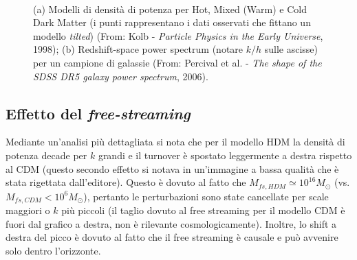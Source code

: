 \begin{figure}[H]
    $\;\;$
    \caption{(a) Modelli di densità di potenza per Hot, Mixed (Warm) e Cold Dark Matter (i punti rappresentano i dati osservati che fittano un modello \textit{tilted}) (From: Kolb - \textit{Particle Physics in the Early Universe}, 1998); (b) Redshift-space power spectrum (notare $k/h$ sulle ascisse) per un campione di galassie (From: Percival et al. - \textit{The shape of the SDSS DR5 galaxy power spectrum}, 2006).} \label{fig8:bella3} 
\end{figure}


\subsection{Effetto del \textit{free-streaming}}
Mediante un'analisi più dettagliata si nota che per il modello HDM la densità di potenza decade per $k$ grandi e il turnover è spostato leggermente a destra rispetto al CDM (questo secondo effetto si notava in un'immagine a bassa qualità che è stata rigettata dall'editore). Questo è dovuto al fatto che $M_{fs, HDM}\simeq 10^{16}M_\odot$ (vs. $M_{fs, CDM}< 10^{6}M_\odot$), pertanto le perturbazioni sono state cancellate per scale maggiori o $k$ più piccoli (il taglio dovuto al free streaming per il modello CDM è fuori dal grafico a destra, non è rilevante cosmologicamente). Inoltre, lo shift a destra del picco è dovuto al fatto che il free streaming è causale e può avvenire solo dentro l'orizzonte. 

